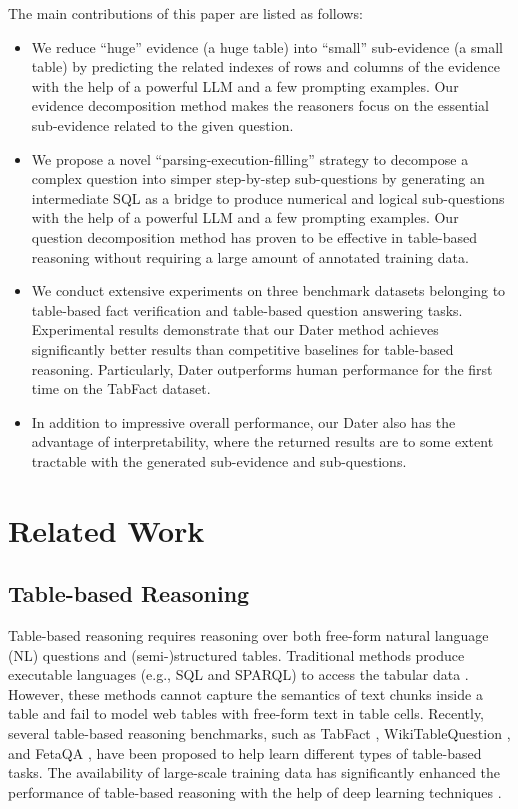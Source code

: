 The main contributions of this paper are listed as follows:
\begin{itemize}
    \item We reduce ``huge'' evidence (a huge table) into ``small'' sub-evidence (a small table) by predicting the related indexes of rows and columns of the evidence with the help of a powerful LLM and a few prompting examples. Our evidence decomposition method makes the reasoners focus on the essential sub-evidence related to the given question.
    \item We propose a novel ``parsing-execution-filling'' strategy to decompose a complex question into simper step-by-step sub-questions by generating an intermediate SQL as a bridge to produce numerical and logical sub-questions with the help of a powerful LLM and a few prompting examples. Our question decomposition method has proven to be effective in table-based reasoning without requiring a large amount of annotated training data. 
    \item We conduct extensive experiments on three benchmark datasets belonging to table-based fact verification and table-based question answering tasks. Experimental results demonstrate that our Dater method achieves significantly better results than competitive baselines for table-based reasoning. Particularly, Dater outperforms human performance for the first time on the TabFact dataset. 
    \item In addition to impressive overall performance, our Dater also has the advantage of interpretability, where the returned results are to some extent tractable with the generated sub-evidence and sub-questions.
\end{itemize}

\section{Related Work}
\subsection{Table-based Reasoning}
Table-based reasoning requires reasoning over both free-form natural language (NL) questions and (semi-)structured tables. Traditional methods produce executable languages (e.g., SQL and SPARQL) to access the tabular data \citep{sqlguide,sparql}. However, these methods cannot capture the semantics of text chunks inside a table and fail to model web tables with free-form text in table cells. 
Recently, several table-based reasoning benchmarks, such as TabFact \citep{tabfact}, WikiTableQuestion \citep{wtq}, and FetaQA \citep{fetaqa},  have been proposed to help learn different types of table-based tasks.  The availability of large-scale training data has significantly enhanced the performance of table-based reasoning with the help of deep learning techniques \citep{neeraja2021incorporating,feverous}.  

